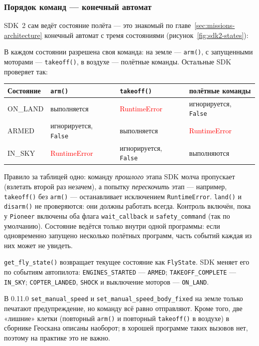 \subsubsection*{Порядок команд --- конечный автомат}

SDK~2 сам ведёт состояние полёта --- это знакомый по главе~\ref{sec:missions-architecture} конечный автомат с тремя состояниями (рисунок~\ref{fig:sdk2-states}):



В каждом состоянии разрешена своя команда: на земле --- \verb|arm()|, с запущенными моторами --- \verb|takeoff()|, в воздухе --- полётные команды. Остальные SDK проверяет так:

\begin{center}
\small
\begin{tabular}{@{}llll@{}}
\toprule
\textbf{Состояние} & \verb|arm()| & \verb|takeoff()| & \textbf{полётные команды} \\
\midrule
ON\_LAND & выполняется & \textcolor{red}{RuntimeError} & игнорируется, \verb|False| \\
ARMED & игнорируется, \verb|False| & выполняется & \textcolor{red}{RuntimeError} \\
IN\_SKY & \textcolor{red}{RuntimeError} & игнорируется, \verb|False| & выполняются \\
\bottomrule
\end{tabular}
\end{center}

Правило за таблицей одно: команду \emph{прошлого} этапа SDK молча пропускает (взлетать второй раз незачем), а попытку \emph{перескочить} этап --- например, \verb|takeoff()| без \verb|arm()| --- останавливает исключением \verb|RuntimeError|. \verb|land()| и \verb|disarm()| не проверяются: они должны работать всегда. Контроль включён, пока у \verb|Pioneer| включены оба флага \verb|wait_callback| и \verb|safety_command| (так по умолчанию). Состояние ведётся только внутри одной программы: если одновременно запущено несколько полётных программ, часть событий каждая из них может не увидеть.

\verb|get_fly_state()| возвращает текущее состояние как \verb|FlyState|. SDK меняет его по событиям автопилота: \verb|ENGINES_STARTED| --- \verb|ARMED|; \verb|TAKEOFF_COMPLETE| --- \verb|IN_SKY|; \verb|COPTER_LANDED|, \verb|SHOCK| и выключение моторов --- \verb|ON_LAND|.

\begin{infobox}
В 0.11.0 \verb|set_manual_speed| и \verb|set_manual_speed_body_fixed| на земле только печатают предупреждение, но команду всё равно отправляют. Кроме того, две «лишние» клетки (повторный \verb|arm()| и повторный \verb|takeoff()| в воздухе) в сборнике Геоскана описаны наоборот; в хорошей программе таких вызовов нет, поэтому на практике это не важно.
\end{infobox}

